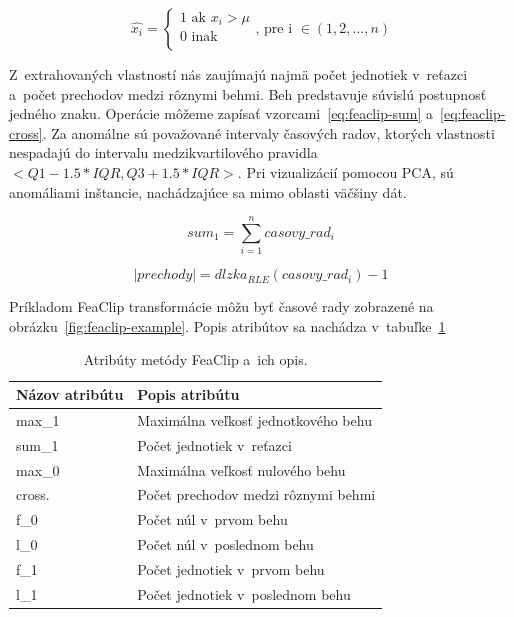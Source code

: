 \documentclass[a4paper,twoside,slovak,12pt,appendix]{article}
\begin{document}
\begin{equation}
  \hat{x_i} =
  \begin{cases}
    1 \text{ ak } x_i > \mu \\
    0 \text{ inak } \\
  \end{cases}
  \text{, pre i } \in (1, 2, ..., n)
  \label{eq:feaclip2}
\end{equation}

\noindent
Z~extrahovaných vlastností nás zaujímajú najmä počet jednotiek v~reťazci a~počet
prechodov medzi rôznymi behmi. Beh predstavuje súvislú postupnosť jedného znaku.
Operácie môžeme zapísať vzorcami~\ref{eq:feaclip-sum} a~\ref{eq:feaclip-cross}.
Za anomálne sú považované intervaly časových radov, ktorých vlastnosti nespadajú
do intervalu medzikvartilového pravidla $<Q1 - 1.5 * IQR, Q3 + 1.5 * IQR>$. Pri
vizualizácií pomocou PCA, sú anomáliami inštancie, nachádzajúce sa mimo oblasti
väčšiny dát.

\begin{equation}
  sum_1 = \sum_{i=1}^{n} casovy\_rad_i
  \label{eq:feaclip-sum}
\end{equation}

\begin{equation}
  |prechody| = dlzka_{RLE}(casovy\_rad_i) - 1
  \label{eq:feaclip-cross}
\end{equation}

\noindent
Príkladom FeaClip transformácie môžu byť časové rady zobrazené na
obrázku~\ref{fig:feaclip-example}. Popis atribútov sa nachádza
v~tabuľke~\ref{tab:feaclip}

\begin{table}[ht]
  \centering
  \caption{Atribúty metódy FeaClip a~ich opis.}
  \label{tab:feaclip}
  \begin{tabular}{|l|l|}
    \hline
    \textbf{Názov atribútu}   &   \textbf{Popis atribútu}  \\ \hline
    max\_1           &   Maximálna veľkosť jednotkového behu   \\ \hline
    sum\_1           &   Počet jednotiek v~reťazci             \\ \hline
    max\_0           &   Maximálna veľkosť nulového behu       \\ \hline
    cross.           &   Počet prechodov medzi rôznymi behmi   \\ \hline
    f\_0             &   Počet núl v~prvom behu                \\ \hline
    l\_0             &   Počet núl v~poslednom behu            \\ \hline
    f\_1             &   Počet jednotiek v~prvom behu          \\ \hline
    l\_1             &   Počet jednotiek v~poslednom behu      \\ \hline
  \end{tabular}
\end{table}
\end{document}
